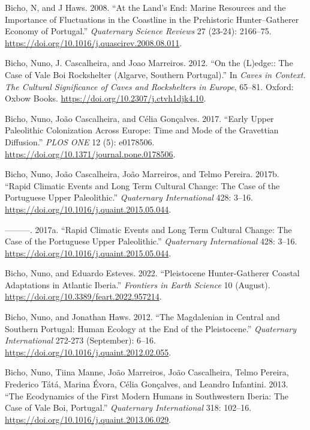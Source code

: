 \documentclass[
  a4paper,
  DIV=11,
  numbers=noendperiod]{scrreprt}
\newlength{\cslhangindent}
\newenvironment{CSLReferences}[2] %
 {\begin{list}{}{%
  \setlength{\itemindent}{0pt}
  \setlength{\leftmargin}{0pt}
  \setlength{\parsep}{0pt}
  \ifodd #1
   \setlength{\leftmargin}{\cslhangindent}
   \setlength{\itemindent}{-1\cslhangindent}
  \fi
  \setlength{\itemsep}{#2\baselineskip}}}
 {\end{list}}
\begin{document}
\begin{CSLReferences}{1}{0}
Bicho, N, and J Haws. 2008. {``At the Land's End: {Marine} Resources and
the Importance of Fluctuations in the Coastline in the Prehistoric
Hunter--Gatherer Economy of {Portugal}.''} \emph{Quaternary Science
Reviews} 27 (23-24): 2166--75.
\url{https://doi.org/10.1016/j.quascirev.2008.08.011}.

Bicho, Nuno, J. Cascalheira, and Joao Marreiros. 2012. {``On the
({L})edge:: {The Case} of {Vale Boi Rockshelter} ({Algarve}, {Southern
Portugal}).''} In \emph{Caves in {Context}. {The Cultural Significance}
of {Caves} and {Rockshelters} in {Europe}}, 65--81. Oxford: Oxbow Books.
\url{https://doi.org/10.2307/j.ctvh1djk4.10}.

Bicho, Nuno, João Cascalheira, and Célia Gonçalves. 2017. {``Early
{Upper Paleolithic} Colonization Across {Europe}: {Time} and Mode of the
{Gravettian} Diffusion.''} \emph{PLOS ONE} 12 (5): e0178506.
\url{https://doi.org/10.1371/journal.pone.0178506}.

Bicho, Nuno, João Cascalheira, João Marreiros, and Telmo Pereira. 2017b.
{``Rapid Climatic Events and Long Term Cultural Change: {The} Case of
the {Portuguese Upper Paleolithic}.''} \emph{Quaternary International}
428: 3--16. \url{https://doi.org/10.1016/j.quaint.2015.05.044}.

---------. 2017a. {``Rapid Climatic Events and Long Term Cultural
Change: The Case of the Portuguese Upper Paleolithic.''}
\emph{Quaternary International} 428: 3--16.
\url{https://doi.org/10.1016/j.quaint.2015.05.044}.

Bicho, Nuno, and Eduardo Esteves. 2022. {``Pleistocene Hunter-Gatherer
Coastal Adaptations in {Atlantic Iberia}.''} \emph{Frontiers in Earth
Science} 10 (August). \url{https://doi.org/10.3389/feart.2022.957214}.

Bicho, Nuno, and Jonathan Haws. 2012. {``The Magdalenian in Central and
Southern Portugal: Human Ecology at the End of the Pleistocene.''}
\emph{Quaternary International} 272-273 (September): 6--16.
\url{https://doi.org/10.1016/j.quaint.2012.02.055}.

Bicho, Nuno, Tiina Manne, João Marreiros, João Cascalheira, Telmo
Pereira, Frederico Tátá, Marina Évora, Célia Gonçalves, and Leandro
Infantini. 2013. {``The Ecodynamics of the First Modern Humans in
{Southwestern Iberia}: {The} Case of {Vale Boi}, {Portugal}.''}
\emph{Quaternary International} 318: 102--16.
\url{https://doi.org/10.1016/j.quaint.2013.06.029}.


\end{CSLReferences}
\end{document}
